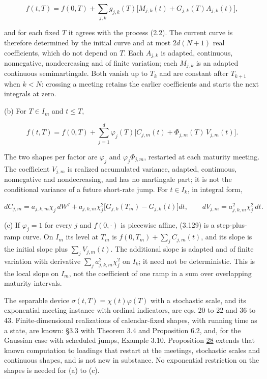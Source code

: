 \documentclass[11pt]{article}
\begin{document}
\begin{equation*}
f(t,T)=f(0,T)+\sum_{j,k}g_{j,k}(T)\bigl[M_{j,k}(t)+G_{j,k}(T)A_{j,k}(t)\bigr], \tag{3.128}\label{eq:3.128}
\end{equation*}

and for each fixed \(T\) it agrees with the process (2.2). The current curve is therefore determined by the initial curve and at most \(2d(N+1)\) real coefficients, which do not depend on \(T\). Each \(A_{j,k}\) is adapted, continuous, nonnegative, nondecreasing and of finite variation; each \(M_{j,k}\) is an adapted continuous semimartingale. Both vanish up to \(T_k\) and are constant after \(T_{k+1}\) when \(k<N\): crossing a meeting retains the earlier coefficients and starts the next integrals at zero.

(b) For \(T\in I_m\) and \(t\le T\),

\begin{equation*}
f(t,T)=f(0,T)+\sum_{j=1}^d\varphi_j(T)\bigl[C_{j,m}(t)+\Phi_{j,m}(T)\,V_{j,m}(t)\bigr]. \tag{3.129}\label{eq:3.129}
\end{equation*}

The two shapes per factor are \(\varphi_j\) and \(\varphi_j\Phi_{j,m}\), restarted at each maturity meeting. The coefficient \(V_{j,m}\) is realized accumulated variance, adapted, continuous, nonnegative and nondecreasing, and has no martingale part; it is not the conditional variance of a future short-rate jump. For \(t\in I_k\), in integral form,

\begin{equation*}
dC_{j,m}=a_{j,k,m}\chi_j\,dW^j+a_{j,k,m}\chi_j^2\bigl[G_{j,k}(T_m)-G_{j,k}(t)\bigr]dt,\qquad dV_{j,m}=a_{j,k,m}^2\chi_j^2\,dt. \tag{3.130}\label{eq:3.130}
\end{equation*}

(c) If \(\varphi_j=1\) for every \(j\) and \(f(0,\cdot)\) is piecewise affine, (3.129) is a step-plus-ramp curve. On \(I_m\) its level at \(T_m\) is \(f(0,T_m)+\sum_jC_{j,m}(t)\), and its slope is the initial slope plus \(\sum_jV_{j,m}(t)\). The additional slope is adapted and of finite variation with derivative \(\sum_ja_{j,k,m}^2\chi_j^2\) on \(I_k\); it need not be deterministic. This is the local slope on \(I_m\), not the coefficient of one ramp in a sum over overlapping maturity intervals.

The separable device \(\sigma(t,T)=\chi(t)\varphi(T)\) with a stochastic scale, and its exponential meeting instance with ordinal indicators, are \cite{brace2024sofr} eqs. 20 to 22 and 36 to 43. Finite-dimensional realizations of calendar-fixed shapes, with running time as a state, are known: \cite{bjork2001existence} §3.3 with Theorem 3.4 and Proposition 6.2, and, for the Gaussian case with scheduled jumps, \cite{fontana2022term} Example 3.10. Proposition \hyperref[res:Proposition-28]{28} extends that known computation to loadings that restart at the meetings, stochastic scales and continuous shapes, and is not new in substance. No exponential restriction on the shapes is needed for (a) to (c).
\end{document}
